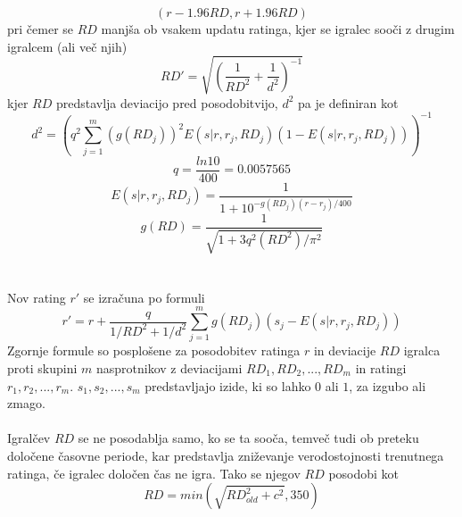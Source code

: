 \documentclass{IEEEtran}
\begin{document}
\begin{equation}
    \left ( r -1.96RD, r +1.96RD \right )
\end{equation}
pri čemer se $RD$ manjša ob vsakem updatu ratinga, kjer se igralec sooči z drugim igralcem (ali več njih)
\begin{equation}
    RD'=\sqrt{\left (  \frac{1}{RD^{2}} + \frac{1}{d^{2}}\right )^{-1}}
\end{equation}
kjer $RD$ predstavlja deviacijo pred posodobitvijo, $d^{2}$ pa je definiran kot
\begin{equation}
    d^{2}=\left ( q^{2} \sum_{j=1}^{m} \left (g\left( RD_{j} \right ) \right )^{2}E\left ( s|r, r_{j}, RD_{j} \right )\left (1-E\left ( s|r, r_{j}, RD_{j} \right ) \right )\right )^{-1} 
\end{equation}
\begin{equation}
    q=\frac{ln10}{400}=0.0057565
\end{equation}
\begin{equation}
    E\left ( s|r, r_{j}, RD_{j} \right )=\frac{1}{1+10^{-g\left ( RD_{j} \right )\left ( r-r_{j} \right )/400}}
\end{equation}
\begin{equation}
g\left ( RD \right )=\frac{1}{\sqrt{1+3q^{2}\left ( RD^{2} \right )/\pi^{2} }}
\end{equation}
\hfill
\\
\\
Nov rating $r'$ se izračuna po formuli
\begin{equation}
    r'=r+\frac{q}{1/RD^{2}+1/d^{2}}\sum_{j=1}^{m}g\left( RD_{j} \right )\left (s_{j}-E\left ( s|r, r_{j}, RD_{j} \right ) \right )
\end{equation}
Zgornje formule so posplošene za posodobitev ratinga $r$ in deviacije $RD$ igralca proti skupini $m$ nasprotnikov z deviacijami 
$RD_{1}, RD_{2}, ..., RD_{m}$ in ratingi $r_{1}, r_{2}, ..., r_{m}$. $s_{1}, s_{2}, ..., s_{m}$ predstavljajo izide, ki so lahko $0$ ali $1$, za izgubo ali zmago.
\hfill
\\
\\
Igralčev $RD$ se ne posodablja samo, ko se ta sooča, temveč tudi ob preteku določene časovne periode, kar predstavlja zniževanje verodostojnosti trenutnega ratinga, če igralec določen čas ne igra. %
Tako se njegov $RD$ posodobi kot
\begin{equation}
    RD = min\left(\sqrt{RD_{old}^{2} + c^{2}}, 350\right)
\end{equation}
\end{document}
